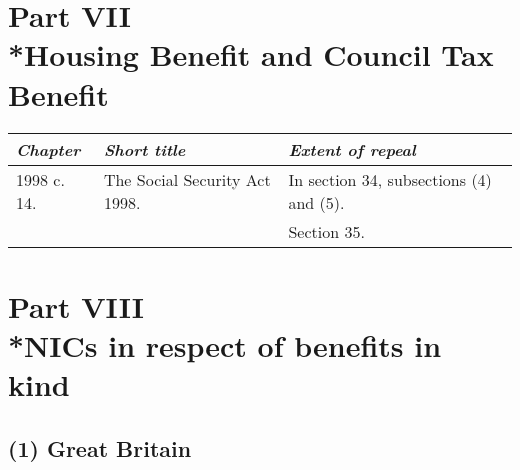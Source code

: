 \documentclass[12pt,a4paper]{article}
\begin{document}
\section[Part VII --- Housing Benefit and Council Tax Benefit]{Part VII\\*Housing Benefit and Council Tax Benefit}

\renewcommand\parthead{--- Schedule 9 Part VII}

{\footnotesize\centering
\begin{tabulary}{\linewidth}{JJJ}
\hline
\itshape Chapter	&\itshape Short title	&\itshape Extent of repeal\\
\hline
1998 c. 14. 	&The Social Security Act 1998. 	&In section 34, subsections (4)  and (5).\\
&&		Section 35.\\ 
\hline
\end{tabulary}

}



\section[Part VIII --- NICs in respect of benefits in kind]{Part VIII\\*NICs in respect of benefits in kind}

\renewcommand\parthead{--- Schedule 9 Part VIII}

\subsection*{(1) 
Great Britain}
\end{document}
